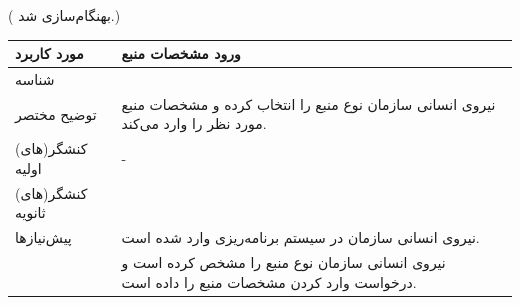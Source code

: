({\color{red} بهنگام‌سازی شد.})
\begin{table}[H]
	\centering
	\begin{tabular}{|p{3cm}|p{11cm}|}
		\hline
		
		مورد کاربرد & ورود مشخصات منبع  \\
		\hline
		
		شناسه & 
		\stepcounter{usecase_ID}
		
		\arabic{usecase_ID} \\
		
		\hline
		
		توضیح مختصر & نیروی انسانی سازمان نوع منبع را انتخاب کرده و مشخصات منبع مورد نظر را وارد می‌کند. \\
		\hline
		
		کنشگر(های) اولیه& - \\
		\hline
		
		کنشگر(های) ثانویه&  \\
		\hline
		
		پیش‌نیازها &
		نیروی انسانی سازمان در سیستم برنامه‌ریزی وارد شده است.\\
		& نیروی انسانی سازمان نوع منبع را مشخص کرده است و درخواست وارد کردن مشخصات منبع را داده است. \\
		\hline
		

\end{tabular}
\end{table}
